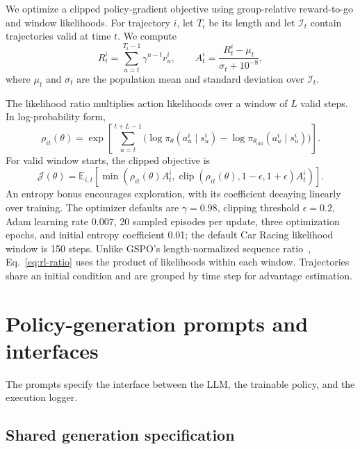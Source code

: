 We optimize a clipped policy-gradient objective using group-relative reward-to-go and window likelihoods.
For trajectory $i$, let $T_i$ be its length and let $\mathcal I_t$ contain trajectories valid at time $t$.
We compute
\begin{equation}
 R_t^i=\sum_{u=t}^{T_i-1}\gamma^{u-t}r_u^i,
 \qquad A_t^i=\frac{R_t^i-\mu_t}{\sigma_t+10^{-8}},
 \label{eq:rl-advantage}
\end{equation}
where $\mu_t$ and $\sigma_t$ are the population mean and standard deviation over $\mathcal I_t$.

The likelihood ratio multiplies action likelihoods over a window of $L$ valid steps.
In log-probability form,
\begin{equation}
 \rho_{it}(\theta)=\exp\!\left[
 \sum_{u=t}^{t+L-1}\bigl(\log\pi_\theta(a_u^i\mid s_u^i)
 -\log\pi_{\theta_{\mathrm{old}}}(a_u^i\mid s_u^i)\bigr)\right].
 \label{eq:rl-ratio}
\end{equation}
For valid window starts, the clipped objective is
\begin{equation}
 \mathcal J(\theta)=\mathbb E_{i,t}\!\left[
 \min\!\left(\rho_{it}(\theta)A_t^i,
 \operatorname{clip}(\rho_{it}(\theta),1-\epsilon,1+\epsilon)A_t^i\right)\right].
 \label{eq:rl-objective}
\end{equation}
An entropy bonus encourages exploration, with its coefficient decaying linearly over training.
The optimizer defaults are $\gamma=0.98$, clipping threshold $\epsilon=0.2$, Adam learning rate $0.007$, 20 sampled episodes per update, three optimization epochs, and initial entropy coefficient 0.01; the default Car Racing likelihood window is 150 steps.
Unlike GSPO's length-normalized sequence ratio~\citep{zheng2025group}, Eq.~\eqref{eq:rl-ratio} uses the product of likelihoods within each window.
Trajectories share an initial condition and are grouped by time step for advantage estimation.

\section{Policy-generation prompts and interfaces}
\label{app:generation}

The prompts specify the interface between the LLM, the trainable policy, and the execution logger.

\subsection{Shared generation specification}
\label{app:specification}

